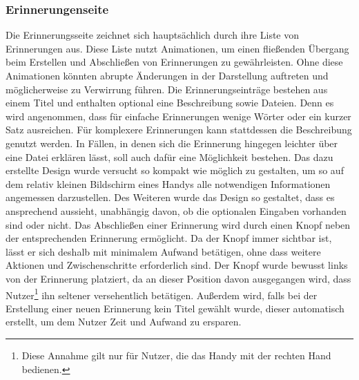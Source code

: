 \subsubsection{Erinnerungenseite}
Die Erinnerungsseite zeichnet sich hauptsächlich durch ihre Liste von Erinnerungen aus. Diese Liste nutzt Animationen, um einen fließenden Übergang beim Erstellen und Abschließen von Erinnerungen zu gewährleisten. Ohne diese Animationen könnten abrupte Änderungen in der Darstellung auftreten und möglicherweise zu Verwirrung führen.\newline%
Die Erinnerungseinträge bestehen aus einem Titel und enthalten optional eine Beschreibung sowie Dateien. %
	Denn es wird angenommen, dass für einfache Erinnerungen wenige Wörter oder ein kurzer Satz ausreichen. Für komplexere Erinnerungen kann stattdessen die Beschreibung genutzt werden. In Fällen, in denen sich die Erinnerung hingegen leichter über eine Datei erklären lässt, soll auch dafür eine Möglichkeit bestehen.\newline%
Das dazu erstellte Design wurde versucht so kompakt wie möglich zu gestalten, um so auf dem relativ kleinen Bildschirm eines Handys alle notwendigen Informationen angemessen darzustellen. %
	Des Weiteren wurde das Design so gestaltet, dass es ansprechend aussieht, unabhängig davon, ob die optionalen Eingaben vorhanden sind oder nicht.\newline%
Das Abschließen einer Erinnerung wird durch einen Knopf neben der entsprechenden Erinnerung ermöglicht. %
	Da der Knopf immer sichtbar ist, lässt er sich deshalb mit minimalem Aufwand betätigen, ohne dass weitere Aktionen und Zwischenschritte erforderlich sind. %
	Der Knopf wurde bewusst links von der Erinnerung platziert, da an dieser Position davon ausgegangen wird, dass Nutzer\footnote{Diese Annahme gilt nur für Nutzer, die das Handy mit der rechten Hand bedienen.} ihn seltener versehentlich betätigen.\newline%
Außerdem wird, falls bei der Erstellung einer neuen Erinnerung kein Titel gewählt wurde, dieser automatisch erstellt, um dem Nutzer Zeit und Aufwand zu ersparen.%
%
%
%